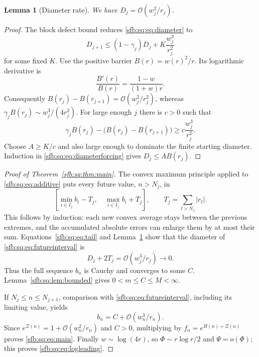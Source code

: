 \documentclass[11pt]{article}
\newtheorem{lemma}[theorem]{Lemma}
\theoremstyle{remark}\newtheorem{remark}[theorem]{Remark}
\newcommand{\OO}{\mathcal O}
\begin{document}
\begin{lemma}[Diameter rate]\label{sfb:sq:lem:diameterrate}
We have $D_j=\OO(w_j^2/r_j)$.
\end{lemma}
\begin{proof}
The block defect bound reduces \eqref{sfb:sq:eq:diameter} to
\begin{equation}\label{sfb:sq:eq:diameterforcing}
 D_{j+1}\le(1-\gamma_j)D_j+K\frac{w_j^3}{r_j^2}
\end{equation}
for some fixed $K$. Use the positive barrier $B(r)=w(r)^2/r$. Its logarithmic derivative is
\begin{equation}\label{sfb:sq:eq:barrier}
 \frac{B'(r)}{B(r)}=\frac{1-w}{(1+w)r}.
\end{equation}
Consequently $B(r_j)-B(r_{j+1})=\OO(w_j^2/r_j^2)$, whereas
$\gamma_jB(r_j)\sim w_j^3/(4r_j^2)$. For large enough $j$ there is $c>0$ such that
\[
 \gamma_jB(r_j)-\bigl(B(r_j)-B(r_{j+1})\bigr)
 \ge c\frac{w_j^3}{r_j^2}.
\]
Choose $A\ge K/c$ and also large enough to dominate the finite starting diameter. Induction in \eqref{sfb:sq:eq:diameterforcing} gives $D_j\le AB(r_j)$.
\end{proof}

\begin{proof}[Proof of Theorem~\ref{sfb:sq:thm:main}]
The convex maximum principle applied to \eqref{sfb:sq:eq:additive} puts every future value, $n>N_j$, in
\begin{equation}\label{sfb:sq:eq:futureinterval}
 \left[\min_{i\in I_j}b_i-T_j,\quad
       \max_{i\in I_j}b_i+T_j\right],
 \qquad T_j=\sum_{l>N_j}|e_l|.
\end{equation}
This follows by induction: each new convex average stays between the previous extremes, and the accumulated absolute errors can enlarge them by at most their sum. Equations~\eqref{sfb:sq:eq:tail} and Lemma~\ref{sfb:sq:lem:diameterrate} show that the diameter of \eqref{sfb:sq:eq:futureinterval} is
\[
 D_j+2T_j=\OO(w_j^3/r_j)\longrightarrow0.
\]
Thus the full sequence $b_n$ is Cauchy and converges to some $C$. Lemma~\ref{sfb:sq:lem:bounded} gives $0<m\le C\le M<\infty$.

If $N_j\le n\le N_{j+1}$, comparison with \eqref{sfb:sq:eq:futureinterval}, including its limiting value, yields
\[
 b_n=C+\OO(w_n^3/r_n).
\]
Since $e^{\Xi(n)}=1+\OO(w_n^2/r_n)$ and $C>0$, multiplying by $f_n=e^{H(n)+\Xi(n)}$ proves \eqref{sfb:sq:eq:main}. Finally $w\sim\log(4r)$, so $\Phi\sim r\log r/2$ and $\Psi=o(\Phi)$; this proves \eqref{sfb:sq:eq:logleading}.
\end{proof}
\end{document}
